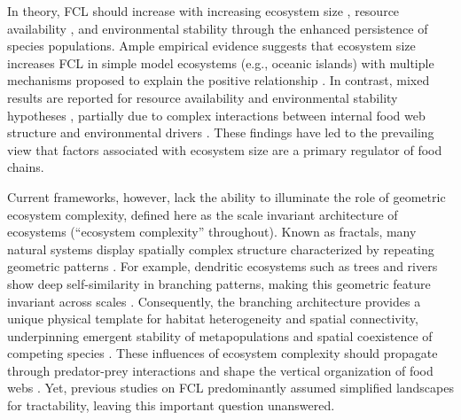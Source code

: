 \documentclass[9pt,twocolumn,twoside]{pnas-new}
\begin{document}
In theory, FCL should increase with increasing ecosystem size \citep{schoener_food_1989}, resource availability \citep{oksanen_exploitation_1981}, and environmental stability \citep{pimm_number_1977} through the enhanced persistence of species populations.
Ample empirical evidence suggests that ecosystem size increases FCL in simple model ecosystems (e.g., oceanic islands) \citep{vander_zanden_patterns_1999, post_ecosystem_2000, takimoto_ecosystem_2008, doi_resource_2009} with multiple mechanisms proposed to explain the positive relationship \citep{takimoto_effects_2012, ward_mechanistic_2017, mcintosh_capacity_2018, terui_spatial_2019}.
In contrast, mixed results are reported for resource availability and environmental stability hypotheses \citep{takimoto_environmental_2013, warfe_productivity_2013, guo_towards_2023}, partially due to complex interactions between internal food web structure and environmental drivers \citep{takimoto_effects_2012, shibasaki_food_2024}.
These findings have led to the prevailing view that factors associated with ecosystem size are a primary regulator of food chains.

Current frameworks, however, lack the ability to illuminate the role of geometric ecosystem complexity, defined here as the scale invariant architecture of ecosystems (``ecosystem complexity'' throughout).
Known as fractals, many natural systems display spatially complex structure characterized by repeating geometric patterns \citep{turner_landscape_2015, rodriguez-iturbe_fractal_2001}.
For example, dendritic ecosystems such as trees and rivers show deep self-similarity in branching patterns, making this geometric feature invariant across scales \citep{peckham_reformulation_1999, rodriguez-iturbe_fractal_2001, terui_revisiting_2024}.
Consequently, the branching architecture provides a unique physical template for habitat heterogeneity and spatial connectivity, underpinning emergent stability of metapopulations \citep{yeakel_synchronisation_2014, mari_metapopulation_2014, terui_metapopulation_2018} and \Parasplit spatial coexistence of competing species \citep{carrara_dendritic_2012, terui_emergent_2021, rinaldo_river_2018}.
These influences of ecosystem complexity should propagate through predator-prey interactions and shape the vertical organization of food webs \citep{pomeranz_ecosystem_2023, anderson_effects_2018, green_long_2023}.
Yet, previous studies on FCL predominantly assumed simplified landscapes for tractability, leaving this important question unanswered.
\end{document}
